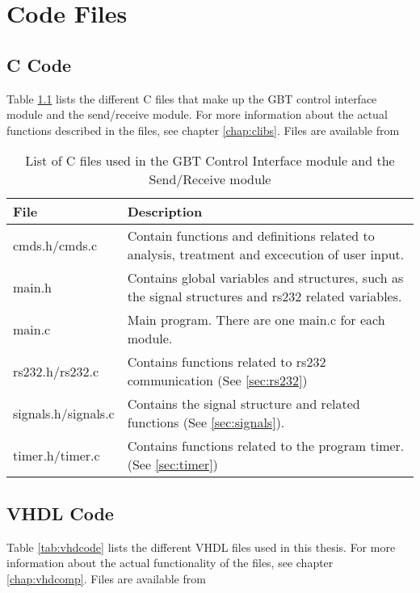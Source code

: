 \documentclass[main.tex]{subfiles}
\begin{document}
\chapter{Code Files}

\section{C Code}

Table \ref{tab:ccode} lists the different C files that make up the GBT control interface module and the send/receive module. For more information about the actual functions described in the files, see chapter \ref{chap:clibs}. Files are available from 

\begin{table}[H]
\centering

\begin{tabular}{l p{8cm}}
\hline
 File & Description \\ \hline
 cmds.h/cmds.c & Contain functions and definitions related to analysis, treatment and excecution of user input.\\ %
 main.h & Contains global variables and structures, such as the signal structures and rs232 related variables. \\ %
 main.c & Main program. There are one main.c for each module.\\ %
 rs232.h/rs232.c & Contains functions related to rs232 communication (See \ref{sec:rs232})\\ %
 signals.h/signals.c & Contains the signal structure and related functions (See \ref{sec:signals}).\\ %
 timer.h/timer.c & Contains functions related to the program timer. (See \ref{sec:timer}) \\ \hline
\end{tabular}
\label{tab:ccode}
\caption{List of C files used in the GBT Control Interface module and the Send/Receive module}
\end{table}

\newpage

\section{VHDL Code}

Table \ref{tab:vhdcode} lists the different VHDL files used in this thesis. For more information about the actual functionality of the files, see chapter \ref{chap:vhdcomp}. Files are available from 
\end{document}
